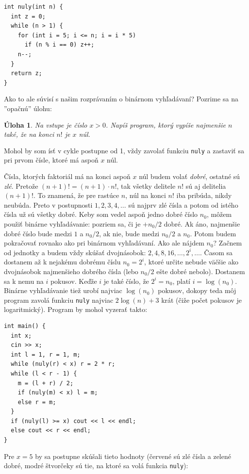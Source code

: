 \documentclass[10pt]{article}
\def\ods{\vspace*{10pt}}
\newtheorem{uloha}{Úloha}
\begin{document}
\ods
\begin{lstlisting}[] 
int nuly(int n) {
  int z = 0;
  while (n > 1) {
    for (int i = 5; i <= n; i = i * 5)
      if (n % i == 0) z++;
    n--;
  }
  return z;
}
\end{lstlisting}


Ako to ale súvisí s našim rozprávaním o binárnom vyhľadávaní? Pozrime sa na ''opačnú''
úlohu:

\begin{uloha}
  Na vstupe je číslo $x>0$. Napíš program, ktorý vypíše najmenšie $n$ také, že na konci
  $n!$ je $x$ núl.
\end{uloha}

Mohol by som ísť v cykle postupne od 1, vždy zavolať funkciu {\tt nuly} a zastaviť sa
pri prvom čísle, ktoré má aspoň $x$ núl. 

\ods 
Čísla, ktorých faktoriál
má na konci aspoň $x$ núl budem volať {\em dobré}, ostatné sú {\em zlé}.
Pretože $(n+1)!=(n+1)\cdot n!$, tak všetky delitele $n!$ sú aj delitelia $(n+1)!$. To znamená,
že pre rastúce $n$, núl na konci $n!$ iba pribúda, nikdy neubúda. Preto v postupnosti
$1,2,3,4,\ldots$ sú najprv zlé čísla a potom od istého čísla už sú všetky dobré.
Keby som vedel aspoň jedno dobré číslo $n_0$, môžem použiť binárne vyhľadávanie:
pozriem sa, či je $+n_0/2$ dobré. Ak áno, najmenšie dobré číslo bude medzi $1$ a $n_0/2$,
ak nie, bude medzi $n_0/2$ a $n_0$. Potom budem pokračovať rovnako ako pri binárnom
vyhľadávaní. Ako ale nájdem $n_0$? Začnem od jednotky a budem vždy skúšať dvojnásobok:
$2,4,8,16,\ldots,2^i,\ldots$. Časom sa dostanem až k nejakému dobrému číslu $n_0=2^i$, 
ktoré určite
nebude väčšie ako dvojnásobok najmenšieho dobrého čísla (lebo $n_0/2$ ešte dobré nebolo).
Dostanem sa k nemu na $i$ pokusov. Keďže $i$ je také číslo, že $2^i=n_0$, platí
$i=\log(n_0)$. Binárne vyhľadávanie tiež urobí najviac $\log(n_0)$ pokusov, dokopy
teda môj program zavolá funkciu {\tt nuly} najviac $2\log(n)+3$ krát (čiže počet
pokusov je logaritmický). 
Program by mohol vyzerať takto:

\ods
\begin{lstlisting}[] 
int main() {
  int x;
  cin >> x;
  int l = 1, r = 1, m;
  while (nuly(r) < x) r = 2 * r;
  while (l < r - 1) {
    m = (l + r) / 2;
    if (nuly(m) < x) l = m;
    else r = m;
  }
  if (nuly(l) >= x) cout << l << endl;
  else cout << r << endl;
}
\end{lstlisting}

Pre $x=5$ by sa postupne skúšali tieto hodnoty (červené sú zlé čísla a zelené dobré,
modré štvorčeky sú tie, na ktoré sa volá funkcia {\tt nuly}):
\end{document}
